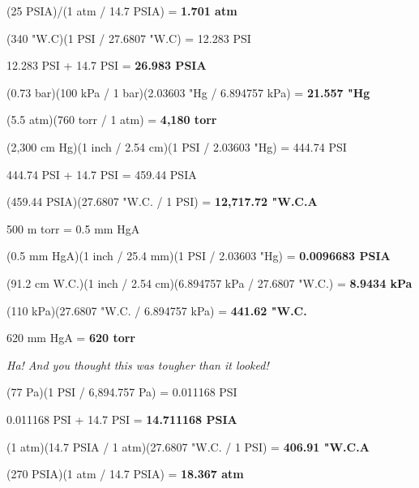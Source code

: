 \vskip 10pt

(25 PSIA)/(1 atm / 14.7 PSIA) = {\bf 1.701 atm}

\vskip 10pt

(340 "W.C)(1 PSI / 27.6807 "W.C) = 12.283 PSI 

12.283 PSI + 14.7 PSI = {\bf 26.983 PSIA}

\vskip 10pt

(0.73 bar)(100 kPa / 1 bar)(2.03603 "Hg / 6.894757 kPa) = {\bf 21.557 "Hg}

\vskip 10pt

(5.5 atm)(760 torr / 1 atm) = {\bf 4,180 torr}

\vskip 10pt

(2,300 cm Hg)(1 inch / 2.54 cm)(1 PSI / 2.03603 "Hg) = 444.74 PSI

444.74 PSI + 14.7 PSI = 459.44 PSIA

(459.44 PSIA)(27.6807 "W.C. / 1 PSI) = {\bf 12,717.72 "W.C.A}

\vskip 10pt

500 m torr = 0.5 mm HgA

(0.5 mm HgA)(1 inch / 25.4 mm)(1 PSI / 2.03603 "Hg) = {\bf 0.0096683 PSIA}

\vskip 10pt

(91.2 cm W.C.)(1 inch / 2.54 cm)(6.894757 kPa / 27.6807 "W.C.) = {\bf 8.9434 kPa}

\vskip 10pt

(110 kPa)(27.6807 "W.C. / 6.894757 kPa) = {\bf 441.62 "W.C.}

\vskip 10pt

620 mm HgA = {\bf 620 torr}

{\it Ha!  And you thought this was tougher than it looked!}

\vskip 10pt

(77 Pa)(1 PSI / 6,894.757 Pa) = 0.011168 PSI

0.011168 PSI + 14.7 PSI = {\bf 14.711168 PSIA}

\vskip 10pt

(1 atm)(14.7 PSIA / 1 atm)(27.6807 "W.C. / 1 PSI) = {\bf 406.91 "W.C.A}

\vskip 10pt

(270 PSIA)(1 atm / 14.7 PSIA) = {\bf 18.367 atm}











\vfil \eject

